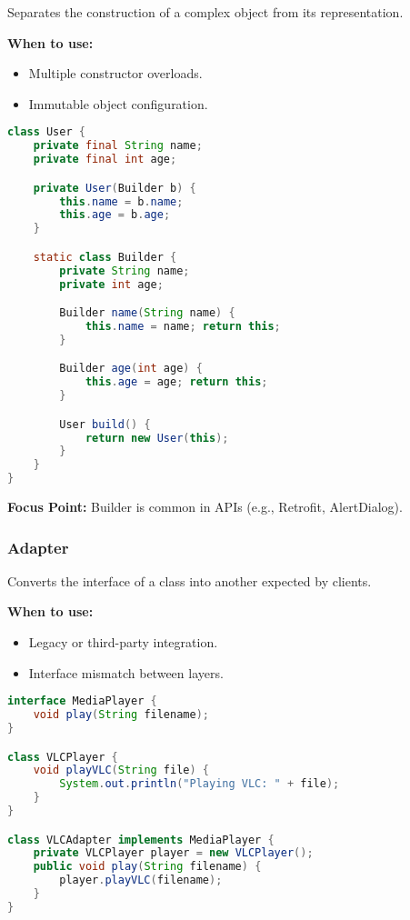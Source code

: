 \documentclass[a4paper,12pt]{article}
\begin{document}
Separates the construction of a complex object from its representation.

\textbf{When to use:}
\begin{itemize}
  \item Multiple constructor overloads.
  \item Immutable object configuration.
\end{itemize}

\begin{lstlisting}[language=Java]
class User {
    private final String name;
    private final int age;

    private User(Builder b) {
        this.name = b.name;
        this.age = b.age;
    }

    static class Builder {
        private String name;
        private int age;

        Builder name(String name) {
            this.name = name; return this;
        }

        Builder age(int age) {
            this.age = age; return this;
        }

        User build() {
            return new User(this);
        }
    }
}
\end{lstlisting}

\textbf{Focus Point:} Builder is common in APIs (e.g., Retrofit, AlertDialog).

\subsubsection{Adapter}

Converts the interface of a class into another expected by clients.

\textbf{When to use:}
\begin{itemize}
  \item Legacy or third-party integration.
  \item Interface mismatch between layers.
\end{itemize}

\begin{lstlisting}[language=Java]
interface MediaPlayer {
    void play(String filename);
}

class VLCPlayer {
    void playVLC(String file) {
        System.out.println("Playing VLC: " + file);
    }
}

class VLCAdapter implements MediaPlayer {
    private VLCPlayer player = new VLCPlayer();
    public void play(String filename) {
        player.playVLC(filename);
    }
}
\end{lstlisting}
\end{document}
